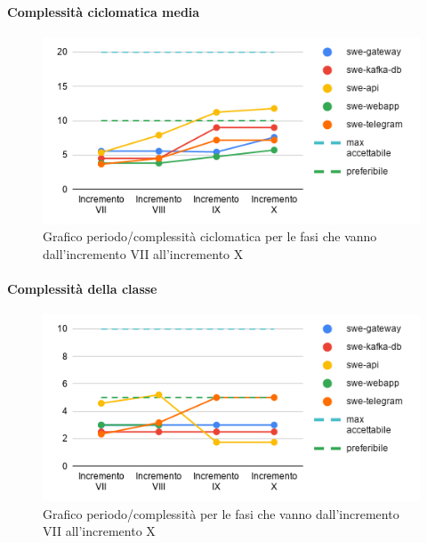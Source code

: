 \paragraph{Complessità ciclomatica media}
\begin{figure}[H]
			\centering
			\includegraphics[width=0.8\linewidth]{./res/images/QM-PROD-11-COCIM.png}
			\caption{Grafico periodo/complessità ciclomatica per le fasi che vanno dall'incremento VII all'incremento X}
			\label{fig:Grafico periodo/complessità ciclomatica per le fasi che vanno dall'incremento VII all'incremento X}
	\end{figure}
\paragraph{Complessità della classe}
\begin{figure}[H]
			\centering
			\includegraphics[width=0.8\linewidth]{./res/images/QM-PROD-12-CCLA.png}
			\caption{Grafico periodo/complessità per le fasi che vanno dall'incremento VII all'incremento X}
			\label{fig:Grafico periodo/complessità per le fasi che vanno dall'incremento VII all'incremento X}
	\end{figure}
